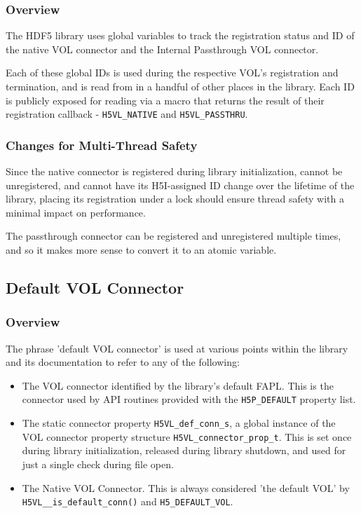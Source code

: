 \documentclass{article}
\begin{document}
\subsubsection{Overview}
The HDF5 library uses global variables to track the registration status and ID of the native VOL connector and the Internal Passthrough VOL connector.

Each of these global IDs is used during the respective VOL's registration and termination, and is read from in a handful of other places in the library. Each ID is publicly exposed for reading via a macro that returns the result of their registration callback - \texttt{H5VL\_NATIVE} and \texttt{H5VL\_PASSTHRU}.

\subsubsection{Changes for Multi-Thread Safety}

Since the native connector is registered during library initialization, cannot be unregistered, and cannot have its H5I-assigned ID change over the lifetime of the library, placing its registration under a lock should ensure thread safety with a minimal impact on performance. 

The passthrough connector can be registered and unregistered multiple times, and so it makes more sense to convert it to an atomic variable.

\subsection{Default VOL Connector}
\label{sec:defaultconnector}

\subsubsection{Overview}
The phrase 'default VOL connector' is used at various points within the library and its documentation to refer to any of the following:

\begin{itemize}
    \item The VOL connector identified by the library's default FAPL. This is the connector used by API routines provided with the \texttt{H5P\_DEFAULT} property list.

    \item The static connector property \texttt{H5VL\_def\_conn\_s}, a global instance of the VOL connector property structure \texttt{H5VL\_connector\_prop\_t}. This is set once during library initialization, released during library shutdown, and used for just a single check during file open.

    \item The Native VOL Connector. This is always considered 'the default VOL' by \texttt{H5VL\_\_is\_default\_conn()} and \texttt{H5\_DEFAULT\_VOL}.
\end{itemize}
\end{document}
